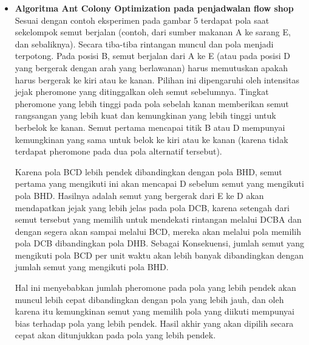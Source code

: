 \documentclass[a4paper,twoside]{article}
\begin{document}
\begin{enumerate}
		\begin{itemize}
		\item {\bf Algoritma Ant Colony Optimization pada penjadwalan flow shop}\\
		Sesuai dengan contoh eksperimen pada gambar 5 terdapat pola saat sekelompok semut berjalan (contoh, dari sumber makanan A ke sarang E, dan sebaliknya). Secara tiba-tiba rintangan muncul dan pola menjadi terpotong. Pada posisi B, semut berjalan dari A ke E (atau pada posisi D yang bergerak dengan arah yang berlawanan) harus memutuskan apakah harus bergerak ke kiri atau ke kanan.
		Pilihan ini dipengaruhi oleh intensitas jejak pheromone yang ditinggalkan oleh semut sebelumnya. Tingkat pheromone yang lebih tinggi pada pola sebelah kanan memberikan semut rangsangan yang lebih kuat dan kemungkinan yang lebih tinggi untuk berbelok ke kanan. Semut pertama mencapai titik B atau D mempunyai kemungkinan yang sama untuk belok ke kiri atau ke kanan (karena tidak terdapat pheromone pada dua pola alternatif tersebut).
		
		Karena pola BCD lebih pendek dibandingkan dengan pola BHD, semut pertama yang mengikuti ini akan mencapai D sebelum semut yang mengikuti pola BHD. Hasilnya adalah semut yang bergerak dari E ke D akan mendapatkan jejak yang lebih jelas pada pola DCB, karena setengah dari semut tersebut yang memilih untuk mendekati rintangan melalui DCBA dan dengan segera akan sampai melalui BCD, mereka akan melalui pola memilih pola DCB dibandingkan pola DHB. Sebagai Konsekuensi, jumlah semut yang mengikuti pola BCD per unit waktu akan lebih banyak dibandingkan dengan jumlah semut yang mengikuti pola BHD.
		
		Hal ini menyebabkan jumlah pheromone pada pola yang lebih pendek akan muncul lebih cepat dibandingkan dengan pola yang lebih jauh, dan oleh karena itu kemungkinan semut yang memilih pola yang diikuti mempunyai bias terhadap pola yang lebih pendek. Hasil akhir yang akan dipilih secara cepat akan ditunjukkan pada pola yang lebih pendek.
		

\end{itemize}
\end{enumerate}
\end{document}
